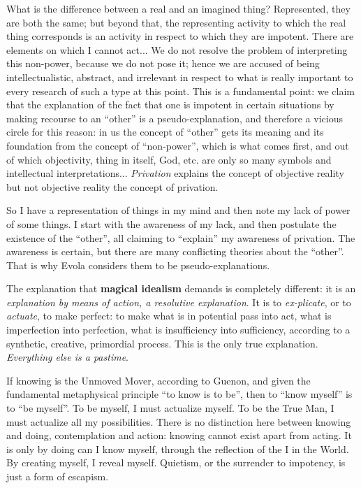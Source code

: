 \begin{quotex}
What is the difference between a real and an imagined thing? Represented, they are both the same; but beyond that, the representing activity to which the real thing corresponds is an activity in respect to which they are impotent. There are elements on which I cannot act... We do not resolve the problem of interpreting this non-power, because we do not pose it; hence we are accused of being intellectualistic, abstract, and irrelevant in respect to what is really important to every research of such a type at this point. This is a fundamental point: we claim that the explanation of the fact that one is impotent in certain situations by making recourse to an ``other'' is a pseudo-explanation, and therefore a vicious circle for this reason: in us the concept of ``other'' gets its meaning and its foundation from the concept of ``non-power'', which is what comes first, and out of which objectivity, thing in itself, God, etc. are only so many symbols and intellectual interpretations... \emph{Privation} explains the concept of objective reality but not objective reality the concept of privation.
\end{quotex}


So I have a representation of things in my mind and then note my lack of power of some things. I start with the awareness of my lack, and then postulate the existence of the ``other'', all claiming to ``explain'' my awareness of privation. The awareness is certain, but there are many conflicting theories about the ``other''. That is why Evola considers them to be pseudo-explanations.

\begin{quotex}
The explanation that \textbf{magical idealism} demands is completely different: it is an \emph{explanation by means of action, a resolutive explanation}. It is to \emph{ex-plicate}, or to \emph{actuate}, to make perfect: to make what is in potential pass into act, what is imperfection into perfection, what is insufficiency into sufficiency, according to a synthetic, creative, primordial process. This is the only true explanation. \emph{Everything else is a pastime}.
\end{quotex}


If knowing is the Unmoved Mover, according to Guenon, and given the fundamental metaphysical principle ``to know is to be'', then to ``know myself'' is to ``be myself''. To be myself, I must actualize myself. To be the True Man, I must actualize all my possibilities. There is no distinction here between knowing and doing, contemplation and action: knowing cannot exist apart from acting. It is only by doing can I know myself, through the reflection of the I in the World. By creating myself, I reveal myself. Quietism, or the surrender to impotency, is just a form of escapism.

